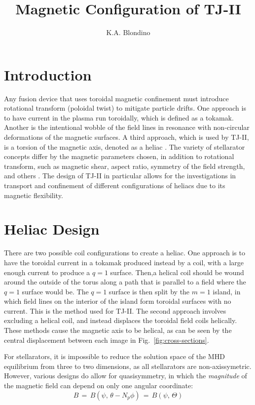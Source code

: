\documentclass[a4paper, 12pt]{article}
\author{K.A. Blondino}
\title{Magnetic Configuration of TJ-II}
\begin{document}
\maketitle
\section*{Introduction}
Any fusion device that uses toroidal magnetic confinement must introduce rotational transform (poloidal twist) to mitigate particle drifts. One approach is to have current in the plasma run toroidally, which is defined as a tokamak. Another is the intentional wobble of the field lines in resonance with non-circular deformations of the magnetic surfaces. A third approach, which is used by TJ-II, is a torsion of the magnetic axis, denoted as a heliac \cite{boozer_what_1998}. The variety of stellarator concepts differ by the magnetic parameters chosen, in addition to rotational transform, such as magnetic shear, aspect ratio, symmetry of the field strength, and others \cite{iaea_fusion_2012}. The design of TJ-II in particular allows for the investigations in transport and confinement of different configurations of heliacs due to its magnetic flexibility.


\section*{Heliac Design}

There are two possible coil configurations to create a heliac. One approach is to have the toroidal current in a tokamak produced instead by a coil, with a large enough current to produce a $q = 1$ surface. Then,a helical coil should be wound around the outside of the torus along a path that is parallel to a field where the $q = 1$ surface would be. The $q = 1$ surface is then split by the $m = 1$ island, in which field lines on the interior of the island form toroidal surfaces with no current. This is the method used for TJ-II. The second approach involves excluding a helical coil, and instead displaces the toroidal field coils helically\cite{boozer_what_1998}. These methods cause the magnetic axis to be helical, as can be seen by the central displacement between each image in Fig.~\ref{fig:cross-sections}.

For stellarators, it is impossible to reduce the solution space of the  MHD equilibrium from three to two dimensions, as all stellarators are non-axissymetric. However, various designs do allow for quasisymmetry, in which the \emph{magnitude} of the magnetic field can depend on only one angular coordinate:
\begin{equation}
	B \,=\, B(\psi,\,\theta - N_p\phi) \,=\, B(\psi,\,\Theta)
\end{equation}
\end{document}
